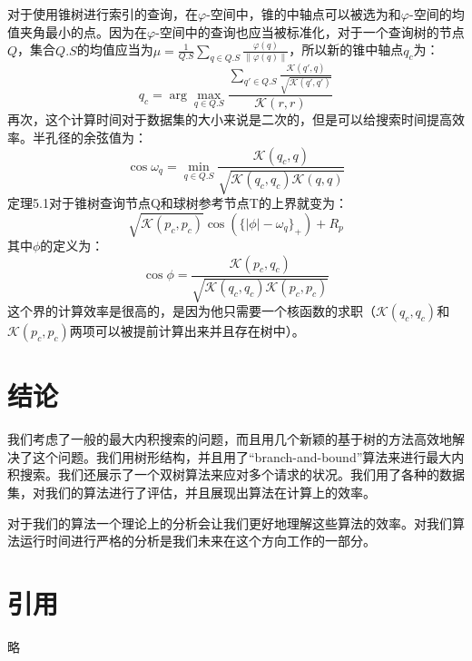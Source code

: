 \documentclass[twocolumn]{article}
\begin{document}
对于使用锥树进行索引的查询，在$\varphi$-空间中，锥的中轴点可以被选为和$\varphi$-空间的均值夹角最小的点。因为在$\varphi$-空间中的查询也应当被标准化，对于一个查询树的节点$Q$，集合$Q.S$的均值应当为$\mu=\frac{1}{Q.S}\sum_{q \in Q.S}\frac{\varphi(q)}{\|\varphi(q)\|}$，所以新的锥中轴点$q_c$为：
\begin{equation}
q_c = \arg \max_{q\in Q.S}\frac{\sum_{q'\in Q.S}\frac{\mathcal{K}(q',q)}{\sqrt{\mathcal{K}(q',q')}}}{\mathcal{K}(r,r)}
\end{equation}
再次，这个计算时间对于数据集的大小来说是二次的，但是可以给搜索时间提高效率。半孔径的余弦值为：
\begin{equation}
\cos\omega_q = \min_{q \in Q.S}\frac{\mathcal{K}(q_c, q)}{\sqrt{\mathcal{K}(q_c, q_c)\mathcal{K}(q,q)}}
\end{equation}
定理5.1对于锥树查询节点Q和球树参考节点T的上界就变为：
\begin{equation}
\sqrt{\mathcal{K}(p_c, p_c)}\cos(\{|\phi| - \omega_q\}_+) + R_p
\end{equation}
其中$\phi$的定义为：
\begin{equation*}
\cos\phi = \frac{\mathcal{K}(p_c, q_c)}{\sqrt{\mathcal{K}(q_c, q_c)\mathcal{K}(p_c,p_c)}}
\end{equation*}
这个界的计算效率是很高的，是因为他只需要一个核函数的求职（$\mathcal{K}(q_c, q_c)$和$\mathcal{K}(p_c,p_c)$两项可以被提前计算出来并且存在树中）。

\section{结论}

我们考虑了一般的最大内积搜索的问题，而且用几个新颖的基于树的方法高效地解决了这个问题。我们用树形结构，并且用了“branch-and-bound”算法来进行最大内积搜索。我们还展示了一个双树算法来应对多个请求的状况。我们用了各种的数据集，对我们的算法进行了评估，并且展现出算法在计算上的效率。

对于我们的算法一个理论上的分析会让我们更好地理解这些算法的效率。对我们算法运行时间进行严格的分析是我们未来在这个方向工作的一部分。

\section{引用}

略
\end{document}
